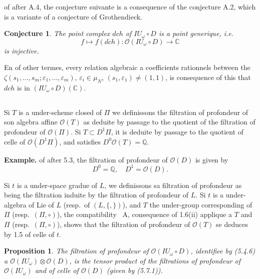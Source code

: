 \documentclass[11pt,a4paper]{article}
\theoremstyle{plain}
\newtheorem{proposition}[theorem]{Proposition}
\newtheorem{conjecture}[theorem]{Conjecture}
\theoremstyle{definition}
\newcommand{\dch}{\mathit{dch}}
\newcommand{\Q}{\mathbb{Q}}
\newcommand{\C}{\mathbb{C}}
\begin{document}
of after A.4, the conjecture suivante is a consequence of the conjecture A.2, which is a variante of a conjecture of Grothendieck.

\begin{conjecture}\label{conj:5.6}
The point complex $\dch$ of $IU_\omega \circ D$ is a point generique, i.e.
\begin{equation}\label{eq:5.6.1}
f \mapsto f(\dch): \mathcal{O}(IU_\omega \circ D) \to \C
\end{equation}
is injective.
\end{conjecture}

En of other termes, every relation algebraic a coefficients rationnels between the $\zeta(s_1,\ldots,s_m; \varepsilon_1,\ldots,\varepsilon_m)$, $\varepsilon_i \in \mu_N$, $(s_1, \varepsilon_1) \neq (1,1)$, is consequence of this that $\dch$ is in $(IU_\omega \circ D)(\C)$.

\subsection{}
Si $T$ is a under-scheme closed of $\Pi$ we definissons the filtration of profondeur of son algebra affine $\mathcal{O}(T)$ as deduite by passage to the quotient of the filtration of profondeur of $\mathcal{O}(\Pi)$. Si $T \subset D^1\Pi$, it is deduite by passage to the quotient of celle of $\mathcal{O}(D^1\Pi)$, and satisfies $D^0\mathcal{O}(T) = \Q$.

\noindent\textbf{Example.} of after 5.3, the filtration of profondeur of $\mathcal{O}(D)$ is given by
\begin{equation}\label{eq:5.7.1}
D^0 = \Q, \quad D^1 = \mathcal{O}(D).
\end{equation}

Si $t$ is a under-space gradue of $L$, we definissons sa filtration of profondeur as being the filtration induite by the filtration of profondeur of $L$. Si $t$ is a under-algebra of Lie of $L$ (resp.~of $(L, \{,\})$), and $T$ the under-group corresponding of $\Pi$ (resp.~$(\Pi, \circ)$), the compatibility \cite{1}~A, consequence of 1.6(ii) applique a $T$ and $\Pi$ (resp.~$(\Pi, \circ)$), shows that the filtration of profondeur of $\mathcal{O}(T)$ se deduces by 1.5 of celle of $t$.

\begin{proposition}\label{prop:5.8}
The filtration of profondeur of $\mathcal{O}(IU_\omega \circ D)$, identifiee by (5.4.6) a $\mathcal{O}(IU_\omega) \otimes \mathcal{O}(D)$, is the tensor product of the filtrations of profondeur of $\mathcal{O}(IU_\omega)$ and of celle of $\mathcal{O}(D)$ (given by (5.7.1)).
\end{proposition}
\end{document}
